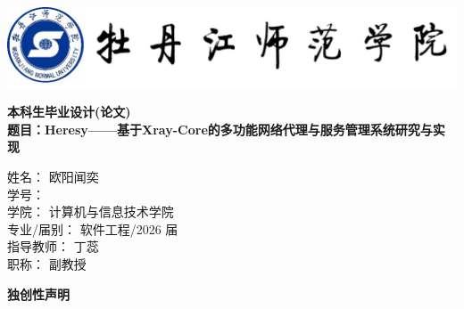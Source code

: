 \documentclass[12pt,a4paper]{article}%
\begin{document}
\pagestyle{fancy}%
\fancyhf{} %
\thispagestyle{empty}%
\begin{center}
	\includegraphics[width=15cm]{img/logo.png} %
	\vspace{0.5cm}

	\Huge \textbf{本科生毕业设计(论文)}\\[2cm]

	\LARGE \textbf{题目：Heresy——基于Xray-Core的多功能网络代理与服务管理系统研究与实现}\\[3cm]
\end{center}

\begin{flushleft}
	\large
	\begin{tabbing}
		姓\hspace{1.5em}名：\hspace{1.5em} \= 欧阳闻奕  \\[0.5cm]
		学\hspace{1.5em}号： \\[0.5cm]
		学\hspace{1.5em}院：\> 计算机与信息技术学院 \\[0.5cm]
		专业/届别：\> 软件工程/2026 届 \\[0.5cm]
		指导教师：\> 丁蕊 \\[0.5cm]
		职\hspace{1.5em}称：\> 副教授 \\[0.5cm]
	\end{tabbing}
\end{flushleft}

\newpage

\thispagestyle{empty}%
\begin{center}
    \large \textbf{独创性声明}
\end{center}
\end{document}
